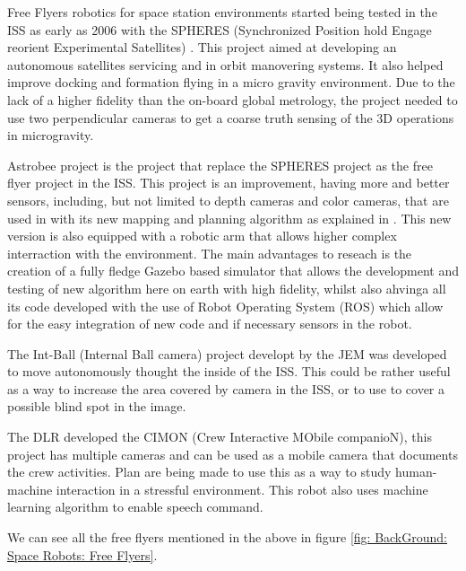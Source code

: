 Free Flyers robotics for space station environments started being tested in the ISS as early as 2006 with the SPHERES (Synchronized Position hold Engage reorient Experimental Satellites) \cite{mohan2009spheres}. This project aimed at developing an autonomous satellites servicing and in orbit manovering systems. It also helped improve docking and formation flying in a micro gravity environment. Due to the lack of a higher fidelity than the on-board global metrology, the project needed to use two perpendicular cameras to get a coarse truth sensing of the 3D operations in microgravity.

Astrobee project \cite{bualat2015astrobee} is the project that replace the SPHERES project as the free flyer project in the ISS. This project is an improvement, having more and better sensors, including, but not limited to depth cameras and color cameras, that are used in with its new mapping and planning algorithm as explained in \cite{fluckiger2018astrobee}. This new version is also equipped with a robotic arm that allows higher complex interraction with the environment. The main advantages to reseach is the creation of a fully fledge Gazebo based simulator that allows the development and testing of new algorithm here on earth with high fidelity, whilst also ahvinga all its code developed with the use of Robot Operating System (ROS) which allow for the easy integration of new code and if necessary sensors in the robot.

The Int-Ball (Internal Ball camera) project developt by the JEM \cite{mitani2019intball} was developed to move autonomously thought the inside of the ISS. This could be rather useful as a way to increase the area covered by camera in the ISS, or to use to cover a possible blind spot in the image.

The DLR developed the CIMON (Crew Interactive MObile companioN)\cite{DLR2018}, this project has multiple cameras and can be used as a mobile camera that documents the crew activities. Plan are being made to use this as a way to study human-machine interaction in a stressful environment. This robot also uses machine learning algorithm to enable speech command. 

We can see all the free flyers mentioned in the above in figure \ref{fig: BackGround: Space Robots: Free Flyers}.

